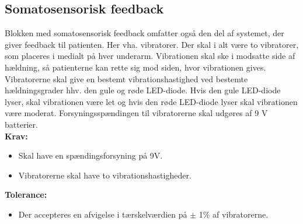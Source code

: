 \subsection{Somatosensorisk feedback} 
Blokken med somatosensorisk feedback omfatter også den del af systemet, der giver feedback til patienten. Her vha. vibratorer. Der skal i alt være to vibratorer, som placeres i medialt på hver underarm. Vibrationen skal ske i modsatte side af hældning, så patienterne kan rette sig mod siden, hvor vibrationen gives. Vibratorerne skal give en bestemt vibrationshastighed ved bestemte hældningsgrader hhv. den gule og røde LED-diode. Hvis den gule LED-diode lyser, skal vibrationen være let og hvis den røde LED-diode lyser skal vibrationen være moderat. Forsyningsspændingen til vibratorerne skal udgøres af 9 V batterier.
\\
\textbf{Krav:}
\begin{itemize}
\item Skal have en spændingsforsyning på 9V.
\item Vibratorerne skal have to vibrationshastigheder.
\end{itemize}
\textbf{Tolerance:}
\begin{itemize}
\item Der accepteres en afvigelse i tærskelværdien på $\pm$ 1\% af vibratorerne.
\end{itemize}

